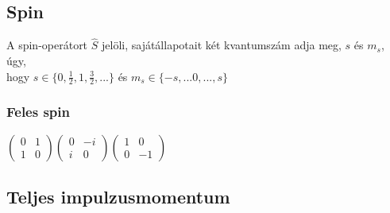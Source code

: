 \documentclass[12pt]{article}
\theoremstyle{plain}
\newcommand{\paulix}{
    \left( \begin{array}{cc}
        0 & 1 \\
        1 & 0
    \end{array}
    \right)
}
\newcommand{\pauliy}{
    \left( \begin{array}{cc}
        0 & -i \\
        i & 0
    \end{array}
    \right)
}
\newcommand{\pauliz}{
    \left( \begin{array}{cc}
        1 & 0 \\
        0 & -1
    \end{array}
    \right)
}
\begin{document}
\subsection{Spin}
A spin-operátort $\hat S$ jelöli, sajátállapotait két kvantumszám adja meg, $s$ és $m_s$, úgy, \\ hogy
$s\in\{0, \frac{1}{2}, 1, \frac{3}{2}, ...\}$ és $m_s \in \{-s, ... 0, ..., s\}$
\subsubsection{Feles spin}
$\paulix\pauliy\pauliz$
\subsection{Teljes impulzusmomentum}
   
\end{document}
